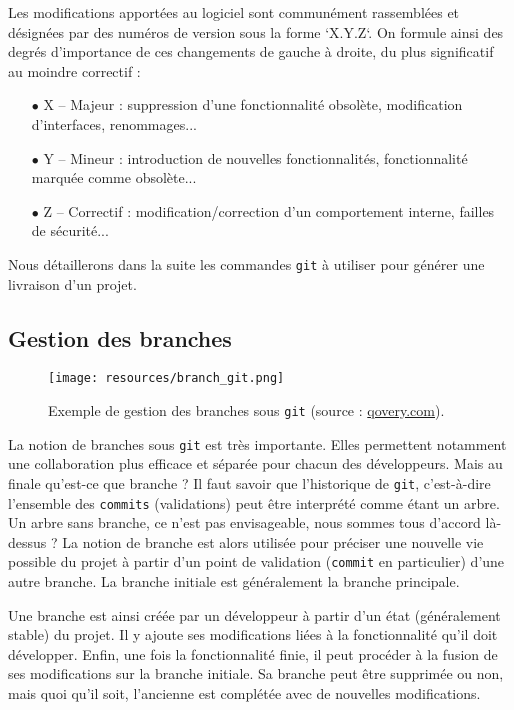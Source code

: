 \documentclass[11pt,a4paper,oneside]{article}
\begin{document}
Les modifications apportées au logiciel sont communément rassemblées et désignées par des numéros de version sous la forme `X.Y.Z`. On formule ainsi des degrés d’importance de ces changements de gauche à droite, du plus significatif au moindre correctif :

\vspace{2mm}
\begin{itemize}
	\item[$\bullet$]  X – Majeur : suppression d’une fonctionnalité obsolète, modification d’interfaces, renommages...
	\item[$\bullet$]  Y – Mineur : introduction de nouvelles fonctionnalités, fonctionnalité marquée comme obsolète...
	\item[$\bullet$]  Z – Correctif : modification/correction d’un comportement interne, failles de sécurité...
\end{itemize}

Nous détaillerons dans la suite les commandes \texttt{git} à utiliser pour générer une livraison d'un projet.

\subsection{Gestion des branches}

\begin{figure}[ht]
	\centering
	\texttt{[image: resources/branch\_git.png]}
	
	\caption{Exemple de gestion des branches sous \texttt{git} (source : \href{https://www.qovery.com/blog/3-ways-of-cloning-an-application-and-a-database-per-git-branch}{qovery.com}).}
	\label{fig:git_branch}
\end{figure}

La notion de branches sous \texttt{git} est très importante. Elles permettent notamment une collaboration plus efficace et séparée pour chacun des développeurs. Mais au finale qu'est-ce que branche ? Il faut savoir que l'historique de \texttt{git}, c'est-à-dire l'ensemble des \texttt{commits} (validations) peut être interprété comme étant un arbre. Un arbre sans branche, ce n'est pas envisageable, nous sommes tous d'accord là-dessus ? La notion de branche est alors utilisée pour préciser une nouvelle vie possible du projet à partir d'un point de validation (\texttt{commit} en particulier) d'une autre branche. La branche initiale est généralement la branche principale.

\vspace{2mm}
Une branche est ainsi créée par un développeur à partir d'un état (généralement stable) du projet. Il y ajoute ses modifications liées à la fonctionnalité qu'il doit développer. Enfin, une fois la fonctionnalité finie, il peut procéder à la fusion de ses modifications sur la branche initiale. Sa branche peut être supprimée ou non, mais quoi qu'il soit, l'ancienne est complétée avec de nouvelles modifications.
\end{document}
